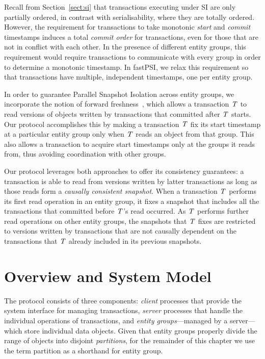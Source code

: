 Recall from Section~\ref{sect:si} that transactions executing under SI are only partially ordered, in contrast with serialisability, where they are totally ordered. However, the requirement for transactions to take monotonic \emph{start} and \emph{commit} timestamps induces a total \emph{commit order} for transactions, even for those that are not in conflict with each other. In the presence of different entity groups, this requirement would require transactions to communicate with every group in order to determine a monotonic timestamp. In fastPSI, we relax this requirement so that transactions have multiple, independent timestamps, one per entity group.

In order to guarantee Parallel Snapshot Isolation across entity groups, we incorporate the notion of forward freshness~\citep{ardekani_nmsi}, which allows a transaction $\mathit{T}$ to read versions of objects written by transactions that committed after $\mathit{T}$ starts. Our protocol accomplishes this by making a transaction $\mathit{T}$ fix its start timestamp at a particular entity group only when $\mathit{T}$ reads an object from that group. This also allows a transaction to acquire start timestamps only at the groups it reads from, thus avoiding coordination with other groups.

Our protocol leverages both approaches to offer its consistency guarantees: a transaction is able to read from versions written by latter transactions as long as those reads form a \emph{causally consistent snapshot}. When a transaction $\mathit{T}$ performs its first read operation in an entity group, it fixes a snapshot that includes all the transactions that committed before $\mathit{T}$'s read occurred. As $\mathit{T}$ performs further read operations on other entity groups, the snapshots that $\mathit{T}$ fixes are restricted to versions written by transactions that are not causally dependent on the transactions that $\mathit{T}$ already included in its previous snapshots.

\section{Overview and System Model}
\label{sect:protocol_overview}

The protocol consists of three components: \emph{client} processes that provide the system interface for managing transactions, \emph{server} processes that handle the individual operations of transactions, and \emph{entity groups}---managed by a server---which store individual data objects. Given that entity groups properly divide the range of objects into disjoint \emph{partitions}, for the remainder of this chapter we use the term partition as a shorthand for entity group.

